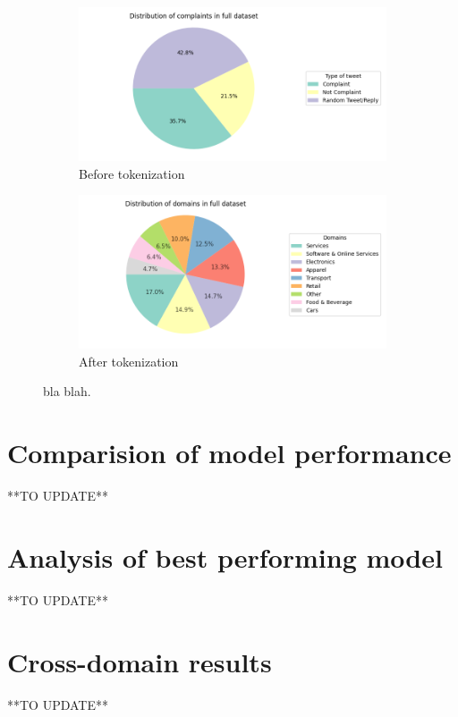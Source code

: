 \begin{figure}[htbp]
    \centering
    \captionsetup{font=small}
    \begin{subfigure}{0.48\textwidth}
        \centering
        \includegraphics[width=\linewidth]{figures/compl_non_random_dist.png}
        \caption{Before tokenization}
        \label{fig: compl_non_random_dist}
    \end{subfigure}
    \hfill
    \begin{subfigure}{0.48\textwidth}
        \centering
        \includegraphics[width=\linewidth]{figures/domain_dist.png}
        \caption{After tokenization}
        \label{fig: domain_dist}
    \end{subfigure}
    \caption{bla blah.}
    \label{fig: compl_main_dist}
\end{figure}


\section{Comparision of model performance}
**TO UPDATE**

\section{Analysis of best performing model}
**TO UPDATE**

\section{Cross-domain results}
**TO UPDATE**